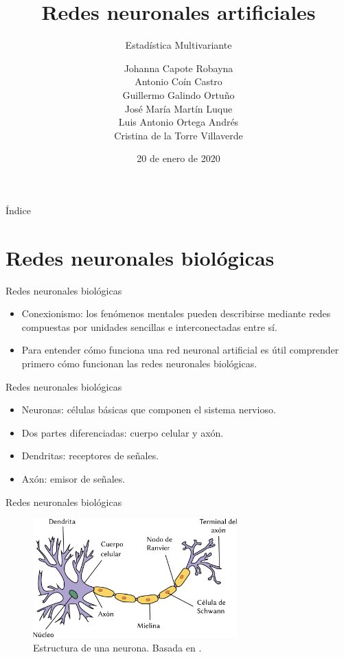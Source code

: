 \documentclass[spanish]{beamer}
\title{Redes neuronales artificiales}
\subtitle{Estadística Multivariante}
\author{
  Johanna Capote Robayna\texorpdfstring{\\}{}
  Antonio Coín Castro\texorpdfstring{\\}{}
  Guillermo Galindo Ortuño\texorpdfstring{\\}{}
  José María Martín Luque\texorpdfstring{\\}{}
  Luis Antonio Ortega Andrés\texorpdfstring{\\}{}
  Cristina de la Torre Villaverde
}
\institute{\normalsize Universidad de Granada}
\date{20 de enero de 2020}
\begin{document}
\maketitle

\begin{frame}{Índice}
  \tableofcontents
\end{frame}

\section{Redes neuronales biológicas}

\begin{frame}{Redes neuronales biológicas}
  \begin{itemize}
    \item Conexionismo: los fenómenos mentales pueden describirse mediante redes compuestas por unidades sencillas e interconectadas entre sí.
    \item Para entender cómo funciona una red neuronal artificial es útil comprender primero cómo funcionan las redes neuronales biológicas.
  \end{itemize}
\end{frame}

\begin{frame}{Redes neuronales biológicas}
  \begin{itemize}
    \item Neuronas: células básicas que componen el sistema nervioso.
    \item Dos partes diferenciadas: cuerpo celular y axón.
    \item Dendritas: receptores de señales.
    \item Axón: emisor de señales.
  \end{itemize}
\end{frame}

\begin{frame}{Redes neuronales biológicas}
  \begin{figure}[b]
    \centering
    \includegraphics[width=0.7\textwidth]{img/neurona}
    \caption{Estructura de una neurona. Basada en \parencite{dhp1080_neurona_2007}.}
    \label{fig:neurona}
  \end{figure}
\end{frame}
\end{document}
